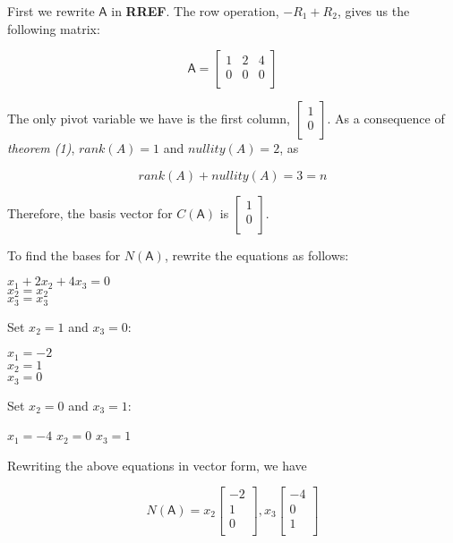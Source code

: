 \documentclass[a4paper, 11pt]{article}
\newcommand{\mat}[1]{\boldsymbol { \mathsf{#1}} }
\begin{document}
\begin{enumerate}
First we rewrite $\mat{A}$ in \textbf{RREF}. The row operation, $-R_1 + R_2$, gives us the following matrix:

\begin{equation*}
    \mat{A} = 
    \begin{bmatrix}
    1 & 2 & 4 \\
    0 & 0 & 0 \\
    \end{bmatrix}
\end{equation*}

The only pivot variable we have is the first column, $\begin{bmatrix}
1 \\
0 \\
\end{bmatrix}$. As a consequence of \textit{theorem (1)}, $rank(A) = 1$ and $nullity(A) = 2$, as 

\begin{equation*}
    rank(A) + nullity(A) = 3 = n
\end{equation*}

Therefore, the basis vector for $C(\mat{A})$ is $\begin{bmatrix}
1 \\
0 \\
\end{bmatrix}$.

To find the bases for $N(\mat{A})$, rewrite the equations as follows:
\begin{center}
    $x_1 + 2x_2 + 4x_3 = 0$\\
    $x_2 = x_2$ \\
    $x_3 = x_3$ \\
\end{center}

Set $x_2 = 1$ and $x_3 = 0$:

\begin{center}
    $x_1  = -2$ \\
    $x_2 = 1$ \\
    $x_3 = 0$ \\
\end{center}

Set $x_2 = 0$ and $x_3 = 1$:

\begin{center}
    $x_1 = -4$
    $x_2 = 0$
    $x_3 = 1$
\end{center}

Rewriting the above equations in vector form, we have

\begin{equation*}
    N(\mat{A}) = x_2 
    \begin{bmatrix}
    -2 \\
    1 \\
    0 \\
    \end{bmatrix},
    x_3
    \begin{bmatrix}
    -4 \\
    0 \\
    1 \\
    \end{bmatrix}
\end{equation*}


\end{enumerate}
\end{document}
